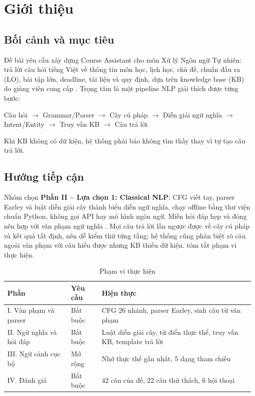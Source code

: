 \section{Giới thiệu}
\label{sec:intro}

\subsection{Bối cảnh và mục tiêu}

Đề bài yêu cầu xây dựng Course Assistant cho môn Xử lý Ngôn ngữ Tự nhiên: trả lời câu hỏi
tiếng Việt về thông tin môn học, lịch học, chủ đề, chuẩn đầu ra (LO), bài tập lớn, deadline,
tài liệu và quy định, dựa trên knowledge base (KB) do giảng viên cung cấp \cite{spec}. Trọng
tâm là một pipeline NLP giải thích được từng bước:
\begin{center}
  \small
  Câu hỏi $\rightarrow$ Grammar/Parser $\rightarrow$ Cây cú pháp $\rightarrow$
  Diễn giải ngữ nghĩa $\rightarrow$ Intent/Entity $\rightarrow$ Truy vấn KB
  $\rightarrow$ Câu trả lời
\end{center}
Khi KB không có dữ kiện, hệ thống phải báo không tìm thấy thay vì tự tạo câu trả lời.

\subsection{Hướng tiếp cận}

Nhóm chọn \textbf{Phần II -- Lựa chọn 1: Classical NLP}: CFG viết tay, parser Earley và luật
diễn giải cây thành biểu diễn ngữ nghĩa, chạy offline bằng thư viện chuẩn Python, không gọi
API hay mô hình ngôn ngữ. Miền hỏi đáp hẹp và đóng nên hợp với văn phạm ngữ nghĩa
\cite{phanthituoi,jurafsky,bird}. Mọi câu
trả lời lần ngược được về cây cú pháp và kết quả tất định, nên dễ kiểm thử từng tầng; hệ
thống cũng phân biệt rõ câu ngoài văn phạm với câu hiểu được nhưng KB thiếu dữ kiện.
 tóm tắt phạm vi thực hiện.

\begin{table}[htbp]
  \centering
  \small
  \begin{tabularx}{\linewidth}{|P{3.6cm}|P{2cm}|L|}
    \hline
    \textbf{Phần} & \textbf{Yêu cầu} & \textbf{Hiện thực} \\ \hline
    I. Văn phạm và parser & Bắt buộc & CFG 26 nhánh, parser Earley, sinh câu từ văn
      phạm \\ \hline
    II. Ngữ nghĩa và hỏi đáp & Bắt buộc & Luật diễn giải cây, từ điển thực thể, truy vấn
      KB, template trả lời \\ \hline
    III. Ngữ cảnh cục bộ & Mở rộng & Nhớ thực thể gần nhất, 5 dạng tham chiếu \\ \hline
    IV. Đánh giá & Bắt buộc & 42 câu của đề, 22 câu thử thách, 6 hội thoại \\ \hline
  \end{tabularx}
  \caption{Phạm vi thực hiện}
  \label{tab:scope}
\end{table}

